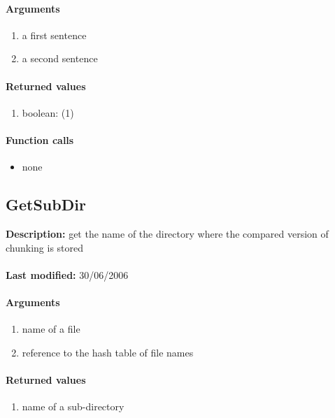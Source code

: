\paragraph{Arguments}
\begin{enumerate}
\item a first sentence
\item a second sentence
\end{enumerate}

\paragraph{Returned values}
\begin{enumerate}
\item boolean: (1)
\end{enumerate}

\paragraph{Function calls}
\begin{itemize}
\item none
\end{itemize}

\subsection{GetSubDir}
\textbf{Description:} get the name of the directory where the compared version of chunking is stored\\
\\\textbf{Last modified:} 30/06/2006

\paragraph{Arguments}
\begin{enumerate}
\item name of a file
\item reference to the hash table of file names
\end{enumerate}

\paragraph{Returned values}
\begin{enumerate}
\item name of a sub-directory
\end{enumerate}

